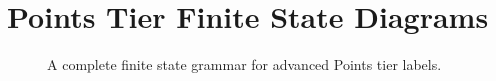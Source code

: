 \documentclass[11pt, twoside]{memoir}
\begin{document}
\section*{Points Tier Finite State Diagrams}
%
%
%

\begin{figure}[H]
\centering
%

%
\caption{A complete finite state grammar for advanced Points tier labels.%
}
\end{figure}




\end{document}
